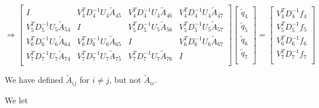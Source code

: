 \begin{equation*}
    \Rightarrow
\begin{bmatrix}
    I    & V^T_4D_4^{-1}U_4\widetilde{A}_{45} & V^T_4D_4^{-1}U_4\widetilde{A}_{46} & V^T_4D_4^{-1}U_4\widetilde{A}_{47} \\
    V^T_5D_5^{-1}U_5\widetilde{A}_{54} & I & V^T_5D_5^{-1}U_5\widetilde{A}_{56} & V^T_5D_5^{-1}U_5\widetilde{A}_{57} \\
    V^T_6D_6^{-1}U_6\widetilde{A}_{64} & V^T_6D_6^{-1}U_6\widetilde{A}_{65} & I & V^T_6D_6^{-1}U_6\widetilde{A}_{67} \\
    V^T_7D_7^{-1}U_7\widetilde{A}_{74} & V^T_7D_7^{-1}U_7\widetilde{A}_{75} & V^T_7D_7^{-1}U_7\widetilde{A}_{76} &    I \\
\end{bmatrix}
\begin{bmatrix}
    \widetilde{q}_4 \\
    \widetilde{q}_5 \\
    \widetilde{q}_6 \\
    \widetilde{q}_7 \\
\end{bmatrix}
=
\begin{bmatrix}
    V^T_4D_4^{-1}f_4 \\
    V^T_5D_5^{-1}f_5 \\
    V^T_6D_6^{-1}f_6 \\
    V^T_7D_7^{-1}f_7 \\
\end{bmatrix}
\end{equation*}

We have defined $\widetilde{A}_{ij}$ for $i \neq j$, but not $\widetilde{A}_{ii}$.

We let


